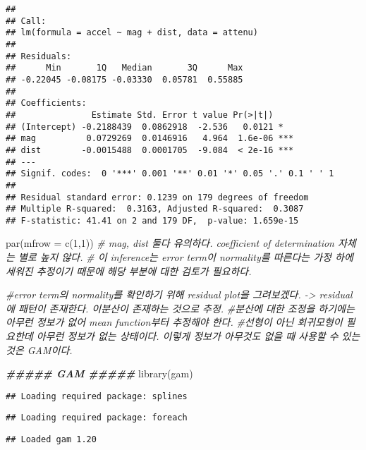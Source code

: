 \documentclass[
]{article}
\newenvironment{Shaded}{\begin{snugshade}}{\end{snugshade}}
\newcommand{\AttributeTok}[1]{\textcolor[rgb]{0.77,0.63,0.00}{#1}}
\newcommand{\CommentTok}[1]{\textcolor[rgb]{0.56,0.35,0.01}{\textit{#1}}}
\newcommand{\DecValTok}[1]{\textcolor[rgb]{0.00,0.00,0.81}{#1}}
\newcommand{\DocumentationTok}[1]{\textcolor[rgb]{0.56,0.35,0.01}{\textbf{\textit{#1}}}}
\newcommand{\FunctionTok}[1]{\textcolor[rgb]{0.00,0.00,0.00}{#1}}
\newcommand{\NormalTok}[1]{#1}
\begin{document}
\begin{verbatim}
## 
## Call:
## lm(formula = accel ~ mag + dist, data = attenu)
## 
## Residuals:
##      Min       1Q   Median       3Q      Max 
## -0.22045 -0.08175 -0.03330  0.05781  0.55885 
## 
## Coefficients:
##               Estimate Std. Error t value Pr(>|t|)    
## (Intercept) -0.2188439  0.0862918  -2.536   0.0121 *  
## mag          0.0729269  0.0146916   4.964  1.6e-06 ***
## dist        -0.0015488  0.0001705  -9.084  < 2e-16 ***
## ---
## Signif. codes:  0 '***' 0.001 '**' 0.01 '*' 0.05 '.' 0.1 ' ' 1
## 
## Residual standard error: 0.1239 on 179 degrees of freedom
## Multiple R-squared:  0.3163, Adjusted R-squared:  0.3087 
## F-statistic: 41.41 on 2 and 179 DF,  p-value: 1.659e-15
\end{verbatim}

\begin{Shaded}
\begin{Highlighting}[]
\FunctionTok{par}\NormalTok{(}\AttributeTok{mfrow =} \FunctionTok{c}\NormalTok{(}\DecValTok{1}\NormalTok{,}\DecValTok{1}\NormalTok{))}
\CommentTok{\# mag, dist 둘다 유의하다. coefficient of determination 자체는 별로 높지 않다. }
\CommentTok{\# 이 inference는 error term이 normality를 따른다는 가정 하에 세워진 추정이기 때문에 해당 부분에 대한 검토가 필요하다.}

\CommentTok{\#error term의 normality를 확인하기 위해 residual plot을 그려보겠다. {-}\textgreater{}  residual에 패턴이 존재한다. 이분산이 존재하는 것으로 추정.}
\CommentTok{\#분산에 대한 조정을 하기에는 아무런 정보가 없어 mean function부터 추정해야 한다. }
\CommentTok{\#선형이 아닌 회귀모형이 필요한데 아무런 정보가 없는 상태이다. 이렇게 정보가 아무것도 없을 때 사용할 수 있는 것은 GAM이다. }

\DocumentationTok{\#\#\#\#\# GAM \#\#\#\#\#}
\FunctionTok{library}\NormalTok{(gam)}
\end{Highlighting}
\end{Shaded}

\begin{verbatim}
## Loading required package: splines
\end{verbatim}

\begin{verbatim}
## Loading required package: foreach
\end{verbatim}

\begin{verbatim}
## Loaded gam 1.20
\end{verbatim}
\end{document}
